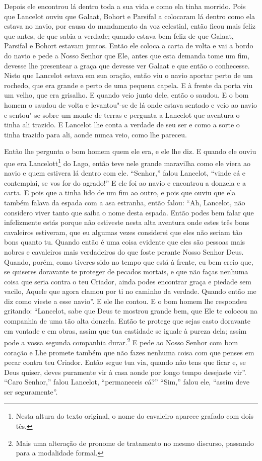 Depois ele encontrou lá dentro toda a sua vida e como ela tinha morrido. Pois
que Lancelot ouviu que Galaat, Bohort e Parsifal a colocaram lá dentro como
ela estava no navio, por causa do mandamento da voz celestial, então ficou mais
feliz que antes, de que sabia a verdade; quando estava bem feliz de que Galaat,
Parsifal e Bohort estavam juntos. Então ele coloca a carta de volta e vai a
bordo do navio e pede a Nosso Senhor que Ele, antes que esta demanda tome um
fim, devesse lhe presentear a graça que devesse ver Galaat e que então o
conhecesse. Nisto que Lancelot estava em sua oração, então viu o navio aportar
perto de um rochedo, que era grande e perto de uma pequena capela. E à frente
da porta viu um velho, que era grisalho. E quando veio junto dele, então o
saudou. E o bom homem o saudou de volta e levantou"-se de lá onde estava sentado
e veio ao navio e sentou"-se sobre um monte de terras e pergunta a Lancelot que
aventura o tinha ali trazido. E Lancelot lhe conta a verdade de seu ser e como
a sorte o tinha trazido para ali, aonde nunca veio, como lhe pareceu.

Então lhe pergunta o bom homem quem ele era, e ele lhe diz. E quando ele ouviu
que era Lancelott\footnote{ Nesta altura do texto original, o nome do
cavaleiro aparece grafado com dois tês.}  do Lago, então teve nele
grande maravilha como ele viera ao navio e quem estivera lá dentro com ele.
“Senhor,” falou Lancelot, “vinde cá e contemplai, se vos for do agrado!” E
ele foi ao navio e encontrou a donzela e a carta. E pois que a tinha lido de um
fim ao outro, e pois que ouviu que ela também falava da espada com a asa
estranha, então falou: “Ah, Lancelot, não considero viver tanto que saiba o
nome desta espada. Então podes bem falar que infelizmente estás porque não estiveste
nesta alta aventura onde estes três bons cavaleiros estiveram, que eu algumas
vezes considerei que eles não seriam tão bons quanto tu. Quando então é uma
coisa evidente que eles são pessoas mais nobres e cavaleiros mais verdadeiros
do que foste perante Nosso Senhor Deus. Quando, porém, como tiveres sido no
tempo que está à frente, eu bem creio que, se quiseres doravante te proteger de
pecados mortais, e que não faças nenhuma coisa que seria contra o teu Criador,
ainda podes encontrar graça e piedade sem vacilo, Aquele que agora clamou por
ti no caminho da verdade. Quando então me diz como vieste a esse
navio”. E ele lhe contou. E o bom homem lhe respondeu gritando: “Lancelot,
sabe que Deus te mostrou grande bem, que Ele te colocou na companhia de uma tão
alta donzela. Então te protege que sejas casto doravante em vontade e em obras,
assim que tua castidade se iguale à pureza dela; assim pode a vossa segunda
companhia durar.\footnote{ Mais uma alteração de pronome de tratamento no mesmo
discurso, passando para a modalidade formal.}  E pede ao Nosso
Senhor com bom coração e Lhe promete também que não fazes nenhuma coisa com que
penses em pecar contra teu Criador. Então segue tua via, quando não tens que
ficar e, se Deus quiser, deves puramente vir à casa aonde por longo tempo
desejaste vir”. “Caro Senhor,” falou Lancelot, “permaneceis cá?” “Sim,” falou
ele, “assim deve ser seguramente”.

